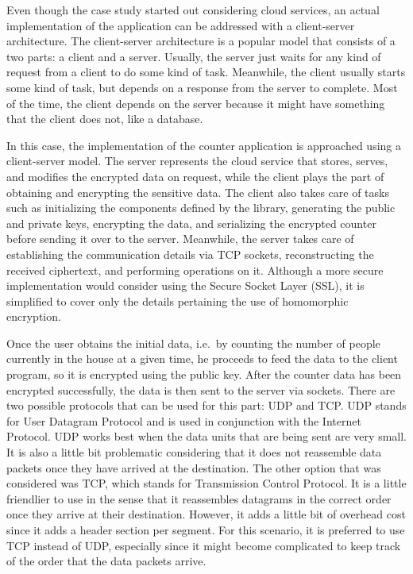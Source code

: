 Even though the case study started out considering cloud services, an actual implementation of the application can be addressed with a client-server architecture. The client-server architecture is a popular model that consists of a two parts: a client and a server. Usually, the server just waits for any kind of request from a client to do some kind of task. Meanwhile, the client usually starts some kind of task, but depends on a response from the server to complete. Most of the time, the client depends on the server because it might have something that the client does not, like a database.

In this case, the implementation of the counter application is approached using a client-server model. The server represents the cloud service that stores, serves, and modifies the encrypted data on request, while the client plays the part of obtaining and encrypting the sensitive data. The client also takes care of tasks such as initializing the components defined by the library, generating the public and private keys, encrypting the data, and serializing the encrypted counter before sending it over to the server. Meanwhile, the server takes care of establishing the communication details via TCP sockets, reconstructing the received ciphertext, and performing operations on it. Although a more secure implementation would consider using the Secure Socket Layer (SSL), it is simplified to cover only the details pertaining the use of homomorphic encryption.

Once the user obtains the initial data, i.e.\ by counting the number of people currently in the house at a given time, he proceeds to feed the data to the client program, so it is encrypted using the public key. After the counter data has been encrypted successfully, the data is then sent to the server via sockets. There are two possible protocols that can be used for this part: UDP and TCP. UDP stands for User Datagram Protocol and is used in conjunction with the Internet Protocol. UDP works best when the data units that are being sent are very small. It is also a little bit problematic considering that it does not reassemble data packets once they have arrived at the destination. The other option that was considered was TCP, which stands for Transmission Control Protocol. It is a little friendlier to use in the sense that it reassembles datagrams in the correct order once they arrive at their destination. However, it adds a little bit of overhead cost since it adds a header section per segment. For this scenario, it is preferred to use TCP instead of UDP, especially since it might become complicated to keep track of the order that the data packets arrive.

